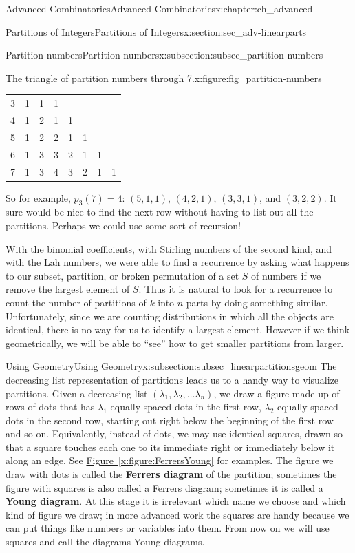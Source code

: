 \documentclass[oneside,10pt,]{book}
\newcommand{\terminology}[1]{\textbf{#1}}
\numberwithin{equation}{chapter}
\begin{document}
\begin{chapterptx}{Advanced Combinatorics}{}{Advanced Combinatorics}{}{}{x:chapter:ch_advanced}
\begin{sectionptx}{Partitions of Integers}{}{Partitions of Integers}{}{}{x:section:sec_adv-linearparts}
\begin{subsectionptx}{Partition numbers}{}{Partition numbers}{}{}{x:subsection:subsec_partition-numbers}
\begin{figureptx}{The triangle of partition numbers through 7.}{x:figure:fig_partition-numbers}
\begin{tabular}{llllllll}
3&1&1&1&&&&\tabularnewline[0pt]
4&1&2&1&1&&&\tabularnewline[0pt]
5&1&2&2&1&1&&\tabularnewline[0pt]
6&1&3&3&2&1&1&\tabularnewline[0pt]
7&1&3&4&3&2&1&1
\end{tabular}
\tcblower
\end{figureptx}%
So for example, \(p_3(7) = 4\): \((5,1,1)\), \((4,2,1)\), \((3,3,1)\), and \((3,2,2)\).  It sure would be nice to find the next row without having to list out all the partitions.  Perhaps we could use some sort of recursion!%
\par
With the binomial coefficients, with Stirling numbers of the second kind, and with the Lah numbers, we were able to find a recurrence by asking what happens to our subset, partition, or broken permutation of a set \(S\) of numbers if we remove the largest element of \(S\). Thus it is natural to look for a recurrence to count the number of partitions of \(k\) into \(n\) parts by doing something similar. Unfortunately, since we are counting distributions in which all the objects are identical, there is no way for us to identify a largest element. However if we think geometrically, we will be able to ``see'' how to get smaller partitions from larger.%
\end{subsectionptx}
%
%
\typeout{************************************************}
\typeout{************************************************}
%
\begin{subsectionptx}{Using Geometry}{}{Using Geometry}{}{}{x:subsection:subsec_linearpartitionsgeom}
The decreasing list representation of partitions leads us to a handy way to visualize partitions. Given a decreasing list \((\lambda_1,\lambda_2,\ldots \lambda_n)\), we draw a figure made up of rows of dots that has \(\lambda_1\) equally spaced dots in the first row, \(\lambda_2\) equally spaced dots in the second row, starting out right below the beginning of the first row and so on. Equivalently, instead of dots, we may use identical squares, drawn so that a square touches each one to its immediate right or immediately below it along an edge. See \hyperref[x:figure:FerrersYoung]{Figure~\ref{x:figure:FerrersYoung}} for examples. The figure we draw with dots is called the \terminology{Ferrers diagram} of the partition; sometimes the figure with squares is also called a Ferrers diagram; sometimes it is called a \terminology{Young diagram}. At this stage it is irrelevant which name we choose and which kind of figure we draw; in more advanced work the squares are handy because we can put things like numbers or variables into them.  From now on we will use squares and call the diagrams Young diagrams.%

\end{subsectionptx}
\end{sectionptx}
\end{chapterptx}
\end{document}
